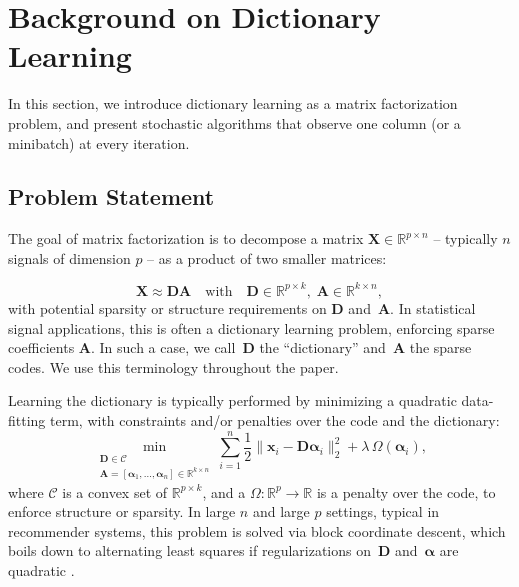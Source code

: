 \documentclass{article}
\def\RR{{\mathbb{R}}}
\def\x{{\mathbf x}}
\def\X{{\mathbf X}}
\def\A{{\mathbf A}}
\def\D{{\mathbf D}}
\def\x{{\mathbf x}}
\newcommand{\balpha}{\boldsymbol{\alpha}}
\begin{document}
\section{Background on Dictionary Learning}
{
In this section, we introduce dictionary learning as a matrix
factorization problem, and present stochastic algorithms that observe one
column (or a minibatch) at every iteration. 

\subsection{Problem Statement}
The goal of matrix factorization is to decompose a matrix $\X \in \RR^{p \times
n}$ -- typically $n$ signals of dimension $p$ -- as a product of two
smaller matrices:}
\begin{equation}
    \X \approx \D \A
 \quad \text{with}\quad\D \in \RR^{p \times k}, \;\A \in \RR^{k \times n},
\end{equation}
with potential sparsity or structure requirements on $\D$ and~$\A$. In
statistical signal applications, this is often a dictionary learning
problem, enforcing sparse coefficients $\A$.
In such a case, we call~$\D$ the ``dictionary'' and~$\A$ the sparse codes.
We use this terminology throughout the paper.





Learning the dictionary is typically performed by minimizing a quadratic
data-fitting term, with constraints and/or penalties over the code and the dictionary:
 \begin{equation}
    \min_{\substack{\D \in \mathcal{C} \\ \A=[\balpha_1,\ldots,\balpha_n]
    \in \RR^{k\times n}}} \sum_{i=1}^n
    \frac{1}{2}
    \bigl\|
    \x_i
    - \D \balpha_i
    \bigr\|_2^2 + \lambda \, \Omega(\balpha_i),
 \end{equation}
where $\mathcal{C}$ is
a convex set of $\RR^{p \times k}$, and a $\Omega : \RR^p \rightarrow \RR$ is a
penalty over the code, to enforce structure or sparsity.
In large $n$ and large $p$ settings, typical in recommender systems, this
problem is solved via block coordinate descent, which boils down to
alternating least squares if regularizations on~$\D$ and~$\balpha$ are
quadratic \cite{hastie_matrix_2014}.
\end{document}
